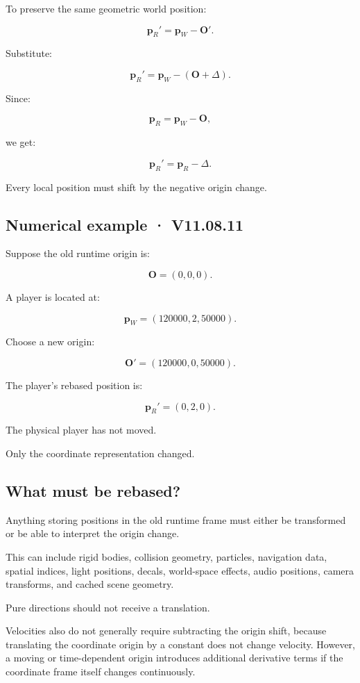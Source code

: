 To preserve the same geometric world position:

\[
 \mathbf p_R'=\mathbf p_W-\mathbf O'.
\]

Substitute:

\[
 \mathbf p_R' = \mathbf p_W-(\mathbf O+\Delta).
\]

Since:

\[
 \mathbf p_R=\mathbf p_W-\mathbf O,
\]

we get:

\[
 \boxed{ \mathbf p_R'=\mathbf p_R-\Delta }.
\]

Every local position must shift by the negative origin change.

\subsection{Numerical example · V11.08.11}\label{02-foundations-ii-ch036-numerical-example-v11.08.11}

Suppose the old runtime origin is:

\[
 \mathbf O=(0,0,0).
\]

A player is located at:

\[
 \mathbf p_W=(120000,2,50000).
\]

Choose a new origin:

\[
 \mathbf O'=(120000,0,50000).
\]

The player's rebased position is:

\[
 \boxed{ \mathbf p_R'=(0,2,0) }.
\]

The physical player has not moved.

Only the coordinate representation changed.

\subsection{What must be rebased?}\label{02-foundations-ii-ch036-what-must-be-rebased}

Anything storing positions in the old runtime frame must either be transformed or be able to interpret the origin change.

This can include rigid bodies, collision geometry, particles, navigation data, spatial indices, light positions, decals, world-space effects, audio positions, camera transforms, and cached scene geometry.

Pure directions should not receive a translation.

Velocities also do not generally require subtracting the origin shift, because translating the coordinate origin by a constant does not change velocity. However, a moving or time-dependent origin introduces additional derivative terms if the coordinate frame itself changes continuously.

